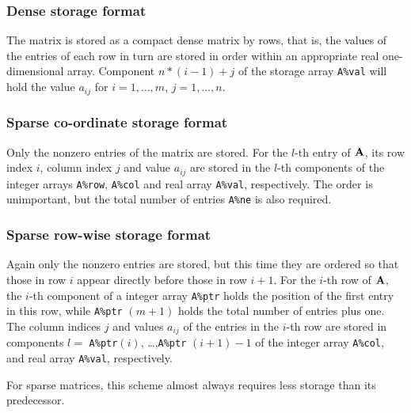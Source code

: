 \documentclass{galahad}
\begin{document}
\subsubsection{Dense storage format}\label{dense}
The matrix is stored as a compact 
dense matrix by rows, that is, the values of the entries of each row in turn are
stored in order within an appropriate real one-dimensional array.
Component $n \ast (i-1) + j$ of the storage array {\tt A\%val} will hold the 
value $a_{ij}$ for $i = 1, \ldots , m$, $j = 1, \ldots , n$.

\subsubsection{Sparse co-ordinate storage format}\label{coordinate}
Only the nonzero entries of the matrix are stored. For the 
$l$-th entry of ${\mathbf{A}}$, its row index $i$, column index $j$ 
and value $a_{ij}$
are stored in the $l$-th components of the integer arrays {\tt A\%row}, 
{\tt A\%col} and real array {\tt A\%val}, respectively.
The order is unimportant, but the total
number of entries {\tt A\%ne} is also required. 

\subsubsection{Sparse row-wise storage format}\label{rowwise}
Again only the nonzero entries are stored, but this time
they are ordered so that those in row $i$ appear directly before those
in row $i+1$. For the $i$-th row of ${\mathbf{A}}$, the $i$-th component of a 
integer array {\tt A\%ptr} holds the position of the first entry in this row,
while {\tt A\%ptr} $(m+1)$ holds the total number of entries plus one.
The column indices $j$ and values $a_{ij}$ of the entries in the $i$-th row 
are stored in components 
$l =$ {\tt A\%ptr}$(i)$, \ldots ,{\tt A\%ptr} $(i+1)-1$ of the 
integer array {\tt A\%col}, and real array {\tt A\%val}, respectively. 

For sparse matrices, this scheme almost always requires less storage than 
its predecessor.







\end{document}

